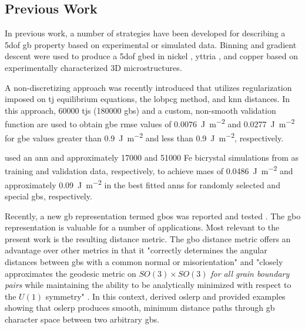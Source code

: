\documentclass[preprint,12pt]{elsarticle}
\begin{document}
\subsection{Previous Work}
In previous work, a number of strategies have been developed for describing a \gls{5dof} \gls{gb} property based on experimental or simulated data. Binning and gradient descent were used to produce a \gls{5dof} \gls{gbed} in nickel \cite{liRelativeGrainBoundary2009}, yttria \cite{dillonCharacterizationGrainboundaryCharacter2009}, and copper \cite{randleFiveparameterGrainBoundary2008} based on experimentally characterized 3D microstructures. 

A non-discretizing approach was recently introduced \cite{shenDeterminingGrainBoundary2019} that utilizes regularization imposed on \gls{tj} equilibrium equations, the \gls{lobpcg} method, and \gls{knn} distances. In this approach, \num{60000} \glspl{tj} (\num{180000} \glspl{gb}) and a custom, non-smooth validation function are used to obtain \gls{gbe} \gls{rmse} values of \SI{0.0076}{\J\per\square\meter} and \SI{0.0277}{\J\per\square\meter} for \gls{gbe} values greater than \SI{0.9}{\J\per\square\meter} and less than \SI{0.9}{\J\per\square\meter}, respectively. 

\citet{echeverrirestrepoUsingArtificialNeural2014} used an \gls{ann} and approximately \num{17000} and \num{51000} Fe bicrystal simulations from \citet{kimIdentificationSchemeGrain2011} as training and validation data, respectively, to achieve \glspl{mae} of \SI{0.0486}{\J\per\square\meter} and approximately \SI{0.09}{\J\per\square\meter} in the best fitted \glspl{ann} for randomly selected and special \glspl{gb}, respectively. 

Recently, a new \gls{gb} representation termed \glspl{gbo} was reported \cite{francisGeodesicOctonionMetric2019} and tested \cite{chesserLearningGrainBoundary2020}. The \gls{gbo} representation is valuable for a number of applications. Most relevant to the present work is the resulting distance metric. The \gls{gbo} distance metric offers an advantage over other metrics in that it "correctly determines the angular distances between \glspl{gb} with a common normal or misorientation" and "closely approximates the geodesic metric on $SO(3) \times SO(3)$ \textit{for all grain boundary pairs} while maintaining the ability to be analytically minimized with respect to the $U(1)$ symmetry" \cite{francisGeodesicOctonionMetric2019}. In this context, \citet{francisGeodesicOctonionMetric2019} derived \gls{oslerp} and provided examples showing that \gls{oslerp} produces smooth, minimum distance paths through \gls{gb} character space between two arbitrary \glspl{gb}. 
\end{document}
